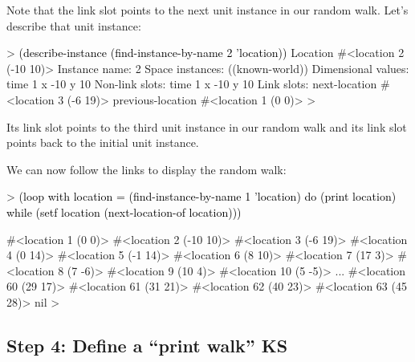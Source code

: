 \documentclass[10pt,twoside,english,pdftex]{article}
\begin{document}
Note that the  link slot points to the next
 unit instance in our random walk.  Let's describe that
unit instance:
%
\begin{example}\color{darkergray}%
  > \textcolor{black}{(describe-instance (find-instance-by-name 2 'location))}
  Location #<location 2 (-10 10)>
    Instance name: 2
    Space instances: ((known-world))
    Dimensional values:
      time 1
      x -10
      y 10
    Non-link slots:
      time 1
      x -10
      y 10
    Link slots:
      next-location #<location 3 (-6 19)>
      previous-location #<location 1 (0 0)>
  >
\end{example}

Its  link slot points to the third  unit
instance in our random walk and its  link slot points
back to the initial  unit instance.

We can now follow the links to display the random walk:
%
\begin{example}\color{darkergray}%
  > \textcolor{black}{(loop with location = (find-instance-by-name 1 'location) 
      do (print location)
      while (setf location (next-location-of location)))}

  #<location 1 (0 0)> 
  #<location 2 (-10 10)> 
  #<location 3 (-6 19)> 
  #<location 4 (0 14)> 
  #<location 5 (-1 14)> 
  #<location 6 (8 10)> 
  #<location 7 (17 3)> 
  #<location 8 (7 -6)> 
  #<location 9 (10 4)> 
  #<location 10 (5 -5)> 
       ...
  #<location 60 (29 17)> 
  #<location 61 (31 21)> 
  #<location 62 (40 23)> 
  #<location 63 (45 28)> 
  nil
  >
\end{example}

\subsection*{Step 4: Define a ``print walk'' KS}
\end{document}
